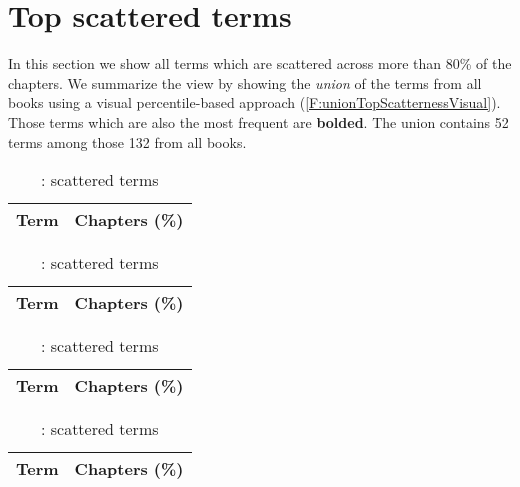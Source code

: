 \section{Top scattered terms}
\label{S:Top30ScatteredTerms}

In this section we show all terms which are scattered across more than 80\% of the chapters.  We summarize the view by showing the \textit{union} of the terms from all books using a visual percentile-based approach (\autoref{F:unionTopScatternessVisual}). Those terms which are also the most frequent are \textbf{bolded}. The union contains 52 terms among those 132 from all books. 

\begin{table*}[h!]
\begin{minipage}[b]{0.5\linewidth}
\centering
\begin{tabular}{lr}
  \hline
    Term & Chapters (\%) \\ 
  \hline
    
   \hline
\end{tabular} 
\caption{\craftTag{}: scattered terms}
\label{T:top30scatteredCraft}
\end{minipage}
\hspace{0.5cm}
\begin{minipage}[b]{0.5\linewidth}
\centering
\begin{tabular}{lr}
  \hline
    Term & Chapters (\%) \\ 
  \hline
    
   \hline
\end{tabular} 
\caption{\lyahTag{}: scattered terms}
\label{T:top30scatteredRWH}
\end{minipage}
\end{table*}

\begin{table*}[h!]
\begin{minipage}[b]{0.5\linewidth}
\centering
\begin{tabular}{lr}
  \hline
    Term & Chapters (\%) \\ 
  \hline
    
   \hline
\end{tabular} 
\caption{\pihTag{}: scattered terms}
\label{T:top30scatteredPIH}
\end{minipage}
\hspace{0.5cm}
\begin{minipage}[b]{0.5\linewidth}
\centering
\begin{tabular}{lr}
  \hline
    Term & Chapters (\%) \\ 
  \hline
    
   \hline
\end{tabular} 
\caption{\rwhTag{}: scattered terms}
\label{T:top30scatteredRWH}
\end{minipage}
\end{table*}

